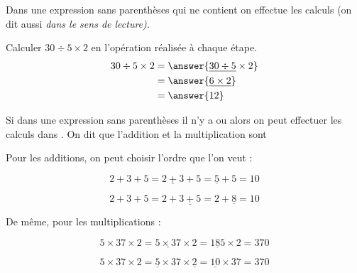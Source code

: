 \begin{convention}
    Dans une expression sans parenthèses qui ne contient  on effectue les calculs  (on dit aussi
    \it{dans le sens de lecture}).
\end{convention}

\begin{exemplebox}
    Calculer $30\div 5 \times 2$ en  l'opération réalisée à chaque étape.
    \begin{align*}
        30\div 5 \times 2 &= \answer{\underline{30\div 5} \times 2}  \\
        &=\answer{\underline{6\times 2}}\\
        &=\answer{12}
    \end{align*}
\end{exemplebox}


\begin{propbox}
    Si dans une expression sans parenthèses il n'y a  ou
     alors on peut effectuer les calculs dans
    . 
    \newline
    \newline
    On dit que l'addition et la multiplication sont 
\end{propbox}

\begin{exemplebox}
    Pour les additions, on peut choisir l'ordre que l'on veut : 

    \begin{minipage}{0.48\textwidth}
        $$2+3+5 = \underline{2+3}+5 = \underline{5} + 5 = 10$$
    \end{minipage}
    \hfill
    \begin{minipage}{0.48\textwidth}
        $$2+3+5 = 2+ \underline{3+5}= 2 + \underline{8} = 10$$
    \end{minipage}
    \newline
    \newline
    \newline
    De même, pour les multiplications :

    \begin{minipage}{0.48\textwidth}
        $$5\times37\times2 = \underline{5 \times 37} \times 2 = \underline{185} \times 2 = 370$$
    \end{minipage}
    \hfill
    \begin{minipage}{0.48\textwidth}
        $$5\times37\times2 = \underline{5} \times 37 \times \underline{2} = \underline{10}
        \times 37 = 370$$
    \end{minipage}
\end{exemplebox}


